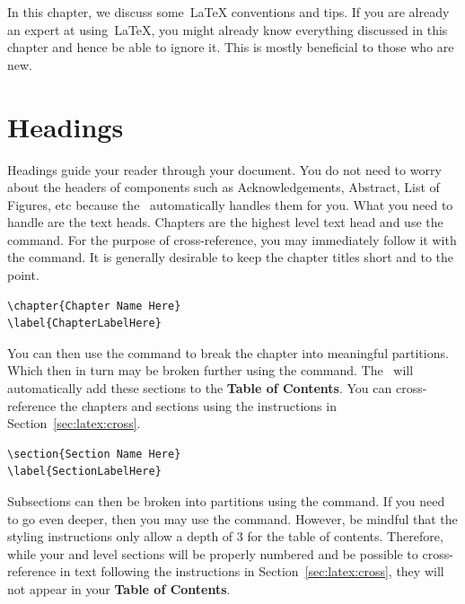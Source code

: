 \documentclass[12pt]{uomthesis}
\begin{document}
In this chapter, we discuss some~\LaTeX{} conventions and tips. If you are already an expert at using~\LaTeX, you might already know everything discussed in this chapter and hence be able to ignore it. This is mostly beneficial to those who are new.  


\section{Headings}
\label{Sec:Latex:Headdings}

Headings guide your reader through your document. You do not need to worry about the headers of components such as Acknowledgements, Abstract, List of Figures, etc because the~\TheClass{} automatically handles them for you. What you need to handle are the text heads. Chapters are the highest level text head and use the  command. For the purpose of cross-reference, you may immediately follow it with the  command. It is generally desirable to keep the chapter titles short and to the point.

\begin{indentedQuote}
\begin{verbatim}
\chapter{Chapter Name Here}
\label{ChapterLabelHere}
\end{verbatim}
\end{indentedQuote}

You can then use the  command to break the chapter into meaningful partitions. Which then in turn may be broken further using the  command. The~\TheClass{} will automatically add these sections to the \textbf{Table of Contents}. You can cross-reference the chapters and sections using the instructions in Section~\ref{sec:latex:cross}. 

\begin{indentedQuote}
\begin{verbatim}
\section{Section Name Here}
\label{SectionLabelHere}
\end{verbatim}
\end{indentedQuote}

Subsections can then be broken into partitions using the  command. If you need to go even deeper, then you may use the  command. However, be mindful that the \UoM{} styling instructions only allow a depth of 3 for the table of contents. Therefore, while your  and  level sections will be properly numbered and be possible to cross-reference in text following the instructions in Section~\ref{sec:latex:cross}, they will not appear in your \textbf{Table of Contents}.  
\end{document}
